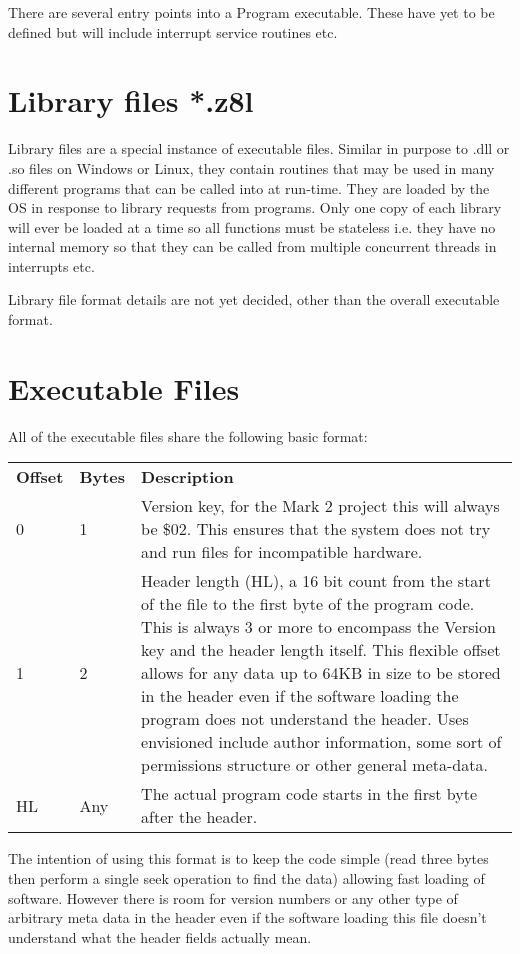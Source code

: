 There are several entry points into a Program executable.  These have yet to be
defined but will include interrupt service routines etc.

\section{Library files *.z8l}
Library files are a special instance of executable files.  Similar in purpose to
.dll or .so files on Windows or Linux, they contain routines that may be used in
many different programs that can be called into at run-time.  They are loaded by
the OS in response to library requests from programs.  Only one copy of each
library will ever be loaded at a time so all functions must be stateless i.e.
they have no internal memory so that they can be called from multiple concurrent
threads in interrupts etc.

Library file format details are not yet decided, other than the overall
executable format.

\section{Executable Files}
\label{sec:exes}
All of the executable files share the following basic format:

\noindent
\begin{tabular}{llp{11.5cm}}
 \textbf{Offset}&\textbf{Bytes}&\textbf{Description}\\
 0&1&Version key, for the Mark 2 project this will always be \$02.  This ensures
     that the system does not try and run files for incompatible hardware.\\
 1&2&Header length (HL), a 16 bit count from the start of the file to the first
     byte of the program code.  This is always 3 or more to encompass the
     Version key and the header length itself.  This flexible offset allows for
     any data up to 64KB in size to be stored in the header even if the software
     loading the program does not understand the header.  Uses envisioned
     include author information, some sort of permissions structure or other
     general meta-data.\\
 HL&Any&The actual program code starts in the first byte after the header.\\
\end{tabular}

The intention of using this format is to keep the code simple (read three bytes
then perform a single seek operation to find the data) allowing fast loading of
software.  However there is room for version numbers or any other type of
arbitrary meta data in the header even if the software loading this file doesn't
understand what the header fields actually mean.
